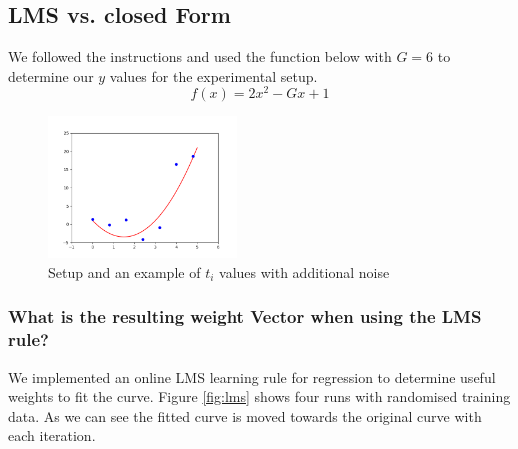 \subsection{LMS vs. closed Form}
We followed the instructions and used the  function below with $G = 6$ to determine our $y$ values for the experimental setup.
\begin{equation}
f(x) = 2x^2 - Gx +1
\end{equation}


\begin{figure}[!h]
\begin{center}
\centering
\includegraphics[width=5cm]{figures/setup.png}
\end{center}
\caption{ Setup and an example of $t_i$ values with additional noise}
\end{figure}

\subsubsection{What is the resulting weight Vector when using the LMS rule?}
We implemented an online LMS learning rule for regression to determine useful weights to fit the curve. Figure \ref{fig:lms} shows four runs with randomised training data. As we can see the fitted curve is moved towards the original curve with each iteration. 

